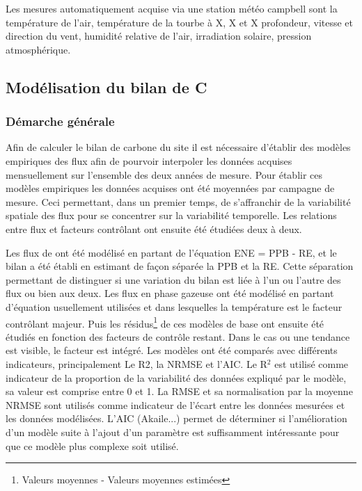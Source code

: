 Les mesures automatiquement acquise via une station météo campbell sont la température de l'air, température de la tourbe à X, X et X profondeur, vitesse et direction du vent, humidité relative de l'air, irradiation solaire, pression atmosphérique.

\subsection{Modélisation du bilan de C}
\subsubsection{Démarche générale}
%
Afin de calculer le bilan de carbone du site il est nécessaire d'établir des modèles empiriques des flux afin de pourvoir interpoler les données acquises mensuellement sur l'ensemble des deux années de mesure.
Pour établir ces modèles empiriques les données acquises ont été moyennées par campagne de mesure.
Ceci permettant, dans un premier temps, de s'affranchir de la variabilité spatiale des flux pour se concentrer sur la variabilité temporelle.
Les relations entre flux et facteurs contrôlant ont ensuite été étudiées deux à deux.

Les flux de \coo ont été modélisé en partant de l'équation ENE = PPB - RE, et le bilan a été établi en estimant de façon séparée la PPB et la RE.
Cette séparation permettant de distinguer si une variation du bilan est liée à l'un ou l'autre des flux ou bien aux deux.
Les flux en phase gazeuse ont été modélisé en partant d'équation usuellement utilisées et dans lesquelles la température est le facteur contrôlant majeur.
Puis les résidus\footnote{Valeurs moyennes - Valeurs moyennes estimées} de ces modèles de base ont ensuite été étudiés en fonction des facteurs de contrôle restant.
Dans le cas ou une tendance est visible, le facteur est intégré.
Les modèles ont été comparés avec différents indicateurs, principalement Le R2, la NRMSE et l'AIC.
Le R$^{2}$ est utilisé comme indicateur de la proportion de la variabilité des données expliqué par le modèle, sa valeur est comprise entre 0 et 1.
La RMSE et sa normalisation par la moyenne NRMSE sont utilisés comme indicateur de l'écart entre les données mesurées et les données modélisées.
L'AIC (Akaile...) permet de déterminer si l'amélioration d'un modèle suite à l'ajout d'un paramètre est suffisamment intéressante pour que ce modèle plus complexe soit utilisé.

